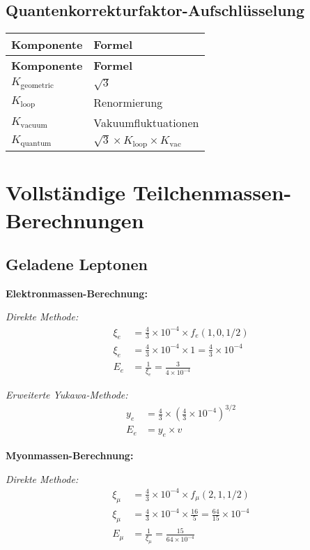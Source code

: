 \documentclass[12pt,a4paper]{article}
\begin{document}
	\subsection{Quantenkorrekturfaktor-Aufschlüsselung}
	
	\begin{longtable}{|p{3cm}|p{4cm}|}
		\hline
		\textbf{Komponente} & \textbf{Formel} \\
		\hline
		\endfirsthead
		\hline
		\textbf{Komponente} & \textbf{Formel} \\
		\hline
		\endhead
		\(K_{\text{geometric}}\) & \(\sqrt{3}\) \\
		\hline
		\(K_{\text{loop}}\) & Renormierung \\
		\hline
		\(K_{\text{vacuum}}\) & Vakuumfluktuationen \\
		\hline
		\(K_{\text{quantum}}\) & \(\sqrt{3} \times K_{\text{loop}} \times K_{\text{vac}}\) \\
		\hline
	\end{longtable}
	
	\section{Vollständige Teilchenmassen-Berechnungen}
	
	\subsection{Geladene Leptonen}
	
	\textbf{Elektronmassen-Berechnung:}
	
	\textit{Direkte Methode:}
	\begin{align}
		\xi_e &= \frac{4}{3} \times 10^{-4} \times f_e(1,0,1/2) \\
		\xi_e &= \frac{4}{3} \times 10^{-4} \times 1 = \frac{4}{3} \times 10^{-4} \\
		E_{e} &= \frac{1}{\xi_e} = \frac{3}{4 \times 10^{-4}}
	\end{align}
	
	\textit{Erweiterte Yukawa-Methode:}
	\begin{align}
		y_e &= \frac{4}{3} \times \left(\frac{4}{3} \times 10^{-4}\right)^{3/2} \\
		E_e &= y_e \times v
	\end{align}
	
	\textbf{Myonmassen-Berechnung:}
	
	\textit{Direkte Methode:}
	\begin{align}
		\xi_\mu &= \frac{4}{3} \times 10^{-4} \times f_\mu(2,1,1/2) \\
		\xi_\mu &= \frac{4}{3} \times 10^{-4} \times \frac{16}{5} = \frac{64}{15} \times 10^{-4} \\
		E_{\mu} &= \frac{1}{\xi_\mu} = \frac{15}{64 \times 10^{-4}}
	\end{align}
	
\end{document}
